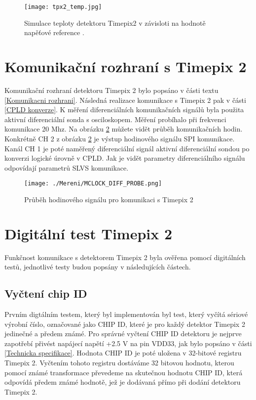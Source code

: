 \begin{figure}[h!]
	\centering
	\captionsetup{justification=centering}
	\texttt{[image: tpx2\_temp.jpg]}
	\caption{Simulace teploty detektoru Timepix2 v závisloti na hodnotě napěťové reference \cite{tpx2_manual}.} 
	\label{fig:tpx2_temp}
\end{figure}



\section{Komunikační rozhraní s Timepix 2}		%
Komunikační rozhraní detektoru Timepix 2 bylo popsáno v části textu \ref{Komunikacni rozhrani}. Následná  realizace komunikace s Timepix 2 pak v části \ref{CPLD konverze}. K měření diferenciálních komunikačních signálů byla použita aktivní diferenciální sonda s osciloskopem. Měření probíhalo při frekvenci komunikace 20 Mhz. Na obrázku \ref{fig:MCLOCK_DIFF_PROBE} můžete vidět průběh komunikačních hodin. Konkrétně CH 2 z obrázku \ref{fig:MCLOCK_DIFF_PROBE} je výstup hodinového signálu SPI komunikace. Kanál CH 1 je poté naměřený diferenciální signál aktivní diferenciální sondou po konverzi logické úrovně v CPLD. Jak je vidět parametry diferenciálního signálu odpovídají parametrů SLVS komunikace. 
\begin{figure}[h!]
	\centering
	\captionsetup{justification=centering}
	\texttt{[image: ./Mereni/MCLOCK\_DIFF\_PROBE.png]}
	\caption{Průběh hodinového signálu pro komunikaci s Timepix 2} 
	\label{fig:MCLOCK_DIFF_PROBE}
\end{figure}

\section{Digitální test Timepix 2} %
Funkčnost komunikace s detektorem Timepix 2 byla ověřena pomocí digitálních testů, jednotlivé testy budou popsány v následujících částech.
	\subsection{Vyčtení chip ID}
	Prvním digtálním testem, který byl implementován byl test, který vyčítá sériové výrobní číslo, označované jako CHIP ID, které je pro každý detektor Timepix 2 jedinečné a předem známé. Pro správné vyčtení CHIP ID detektoru je nejprve zapotřebí přivést napájecí napětí +2.5 V na pin VDD33, jak bylo popsáno v části \ref{Technicka specifikace}. Hodnota CHIP ID je poté uložena v 32-bitové registru Timepix 2. Vyčtením tohoto registru dostáváme 32 bitovou hodnotu, kterou pomocí známé transformace převedeme na skutečnou hodnotu CHIP ID, která odpovídá předem známé hodnotě, jež je dodávaná přímo při dodání detektoru Timepix 2.
